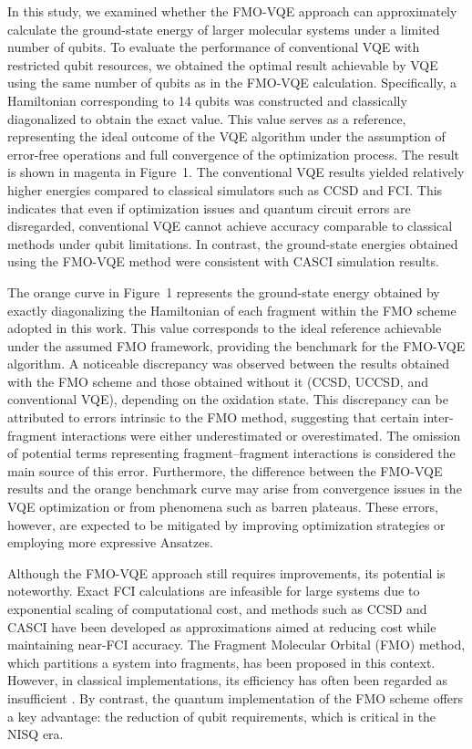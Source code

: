 \documentclass[pdflatex,sn-mathphys-num]{sn-jnl}%
\theoremstyle{thmstyleone}%
\theoremstyle{thmstyletwo}%
\theoremstyle{thmstylethree}%
\begin{document}
In this study, we examined whether the FMO-VQE approach can approximately calculate the ground-state energy of larger molecular systems under a limited number of qubits.
To evaluate the performance of conventional VQE with restricted qubit resources, we obtained the optimal result achievable by VQE using the same number of qubits as in the FMO-VQE calculation. Specifically, a Hamiltonian corresponding to 14 qubits was constructed and classically diagonalized to obtain the exact value. This value serves as a reference, representing the ideal outcome of the VQE algorithm under the assumption of error-free operations and full convergence of the optimization process. The result is shown in magenta in Figure~1. The conventional VQE results yielded relatively higher energies compared to classical simulators such as CCSD and FCI. This indicates that even if optimization issues and quantum circuit errors are disregarded, conventional VQE cannot achieve accuracy comparable to classical methods under qubit limitations. In contrast, the ground-state energies obtained using the FMO-VQE method were consistent with CASCI simulation results.

The orange curve in Figure~1 represents the ground-state energy obtained by exactly diagonalizing the Hamiltonian of each fragment within the FMO scheme adopted in this work. This value corresponds to the ideal reference achievable under the assumed FMO framework, providing the benchmark for the FMO-VQE algorithm. A noticeable discrepancy was observed between the results obtained with the FMO scheme and those obtained without it (CCSD, UCCSD, and conventional VQE), depending on the oxidation state. This discrepancy can be attributed to errors intrinsic to the FMO method, suggesting that certain inter-fragment interactions were either underestimated or overestimated. The omission of potential terms representing fragment–fragment interactions is considered the main source of this error. Furthermore, the difference between the FMO-VQE results and the orange benchmark curve may arise from convergence issues in the VQE optimization or from phenomena such as barren plateaus. These errors, however, are expected to be mitigated by improving optimization strategies or employing more expressive Ansatzes.

Although the FMO-VQE approach still requires improvements, its potential is noteworthy. Exact FCI calculations are infeasible for large systems due to exponential scaling of computational cost, and methods such as CCSD and CASCI have been developed as approximations aimed at reducing cost while maintaining near-FCI accuracy. The Fragment Molecular Orbital (FMO) method, which partitions a system into fragments, has been proposed in this context. However, in classical implementations, its efficiency has often been regarded as insufficient \cite{FMO10,FMO11}. By contrast, the quantum implementation of the FMO scheme offers a key advantage: the reduction of qubit requirements, which is critical in the NISQ era.
\end{document}
